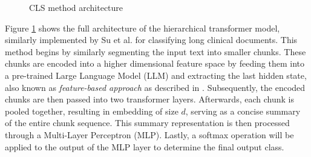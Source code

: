 \begin{figure}[htbp]
    \caption{CLS method architecture}
    \label{fig:cls_method}
\end{figure}


Figure \ref{fig:cls_method} shows the full architecture of the hierarchical transformer model, similarly implemented by Su et al. \cite{su-2021-classifying} for classifying long clinical documents. This method begins by similarly segmenting the input text into smaller chunks. These chunks are encoded into a higher dimensional feature space by feeding them into a pre-trained Large Language Model (LLM) and extracting the last hidden state, also known as \textit{feature-based approach} as described in \cite{sun-2020-fine-tune}. Subsequently, the encoded chunks are then passed into two transformer layers. Afterwards, each chunk is pooled together, resulting in embedding of size \(d\), serving as a concise summary of the entire chunk sequence. This summary representation is then processed through a Multi-Layer Perceptron (MLP). Lastly, a softmax operation will be applied to the output of the MLP layer to determine the final output class.

